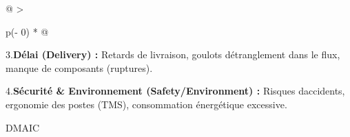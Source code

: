 \documentclass[
]{article}
\begin{document}
\begin{longtable}[]{@{}
  >{\raggedright\arraybackslash}p{(\columnwidth - 0\tabcolsep) * }@{}}
\begin{minipage}[b]{\linewidth}
3.\textbf{Délai (Delivery) :} Retards de livraison, goulots
d\textquotesingle étranglement dans le flux, manque de composants
(ruptures).

4.\textbf{Sécurité \& Environnement (Safety/Environment) :} Risques
d\textquotesingle accidents, ergonomie des postes (TMS), consommation
énergétique excessive.

\begin{center}
\end{center}

DMAIC
\end{minipage} \\
\midrule\noalign{}
\endhead
\bottomrule\noalign{}
\endlastfoot
\end{longtable}
\end{document}
